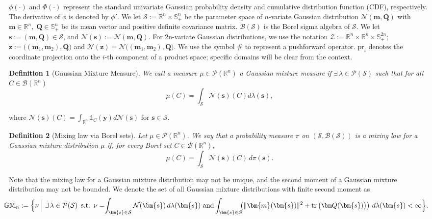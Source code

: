 \documentclass[opre,sglanonrev]{informs4}
\newtheorem{definition}{Definition}
\newcommand{\mS}{\mathcal{S}}
\newcommand{\mN}{\mathcal{N}}
\newcommand{\mP}{\mathcal{P}}
\newcommand{\mB}{\mathcal{B}}
\newcommand{\mbR}{\mathbb R}
\newcommand{\mbS}{\mathbb S}
\newcommand{\mbGM}{\mathbb{GM}}
\newcommand{\ind}{\mathds{1}}
\newcommand{\bmean}{\bm{m}}
\newcommand{\bs}{\bm{s}}
\newcommand{\by}{\bm{y}}
\newcommand{\bz}{\bm{z}}
\newcommand{\bQ}{\bm Q}
\newcommand{\Tr}{\operatorname{tr}}
\begin{document}
$\phi(\cdot)$ and $\Phi(\cdot)$ represent the standard univariate Gaussian probability density and cumulative distribution function (CDF), respectively. The derivative of $\phi$ is denoted by $\phi'$. We let $\mathcal{S} := \mbR^n \times \mbS^n_+$ be the parameter space of $n$-variate Gaussian distribution  $\mathcal{N}(\bmean, \bQ)$ with $\bmean \in \mbR^n,\;\bQ \in \mbS^n_+$ be its mean vector and positive definite covariance matrix. $\mathcal{B}(\mathcal{S})$ is the Borel sigma algebra of $\mathcal{S}$. 
We let  $\bs := (\bmean, \bQ) \in \mathcal{S}$, and $\mathcal{N}(\bs) := \mathcal{N}(\bmean, \bQ)$.  
For 2n-variate Gaussian distributions, we use the notation  $\mathcal{Z}:=\mbR^n\times\mbR^n\times\mbS^{2n}_+$; $\bz := \bigl((\bmean_1,\bmean_2),\bQ\bigr)$ and $\mathcal{N}(\bz)=\mathcal{N}\bigl((\bmean_1,\bmean_2),\bQ\bigr)$.  
We use the symbol $\#$ to represent a pushforward operator. $\mathrm{pr}_i$ denotes the coordinate projection onto the $i$-th component of a product space; specific domains will be clear from the context.

\begin{definition}[Gaussian Mixture Measure]
    We call a measure $\mu \in \mP(\mbR^n)$ a Gaussian mixture measure if $\exists \, \lambda \in \mP(\mS)$ such that for all $C \in \mB(\mbR^n)$
    \[\mu(C) = \int_\mS \mN(\bs)(C) d\lambda(\bs),\]
\end{definition}
\noindent where $\mN(\bs)(C) = \int_{\mbR^n}\ind_C(\by) d\mN(\bs)$ for $\bs \in \mS$.


\begin{definition}[Mixing law via Borel sets]\label{def:mixing-law-set}
Let $\mu \in \mP(\mbR^n)$.  We say that a probability measure $\pi$ on $(\mathcal{S},\mathcal{B}(\mathcal{S}))$ is a mixing law  for a Gaussian mixture distribution $\mu$ if, for every Borel set
$C \in \mB(\mbR^n)$,
\begin{equation}\label{eq:mixing-law-pi1}
   \mu(C)
   =
   \int_{\mathcal{S}} \mN(\bs)(C)\,d\pi(\bs).
\end{equation}
\end{definition}
Note that the mixing law for a Gaussian mixture distribution may not be unique, and the second moment of a Gaussian mixture distribution may not be bounded.  We denote the set of all Gaussian mixture distributions with finite second moment as
\begin{equation}
\hspace{-1em}
\mbGM_n
  := \Bigl\{\nu \;\Big| \;\exists \, \lambda \in \mP(\mS) \,\,\, \mathrm{s.t.} \,\,\, \nu = \hspace{-0.3em}\int_{\bs \in \mS} \mN(\bs)\,d\lambda(\bs) \,\,\text{and}
       \int_{\bs \in \mS}\hspace{-0.5em}\left(\lVert \bmean(\bs)\rVert^2 + \Tr\big(\bQ(\bs)\big)\right)\,d\lambda(\bs) < \infty
       \Bigr\}.
  \label{def: GMMmix}
\end{equation}
\end{document}
